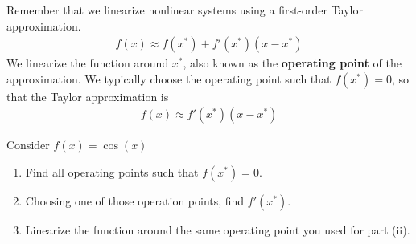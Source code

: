 

Remember that we linearize nonlinear systems using a first-order Taylor approximation.
\begin{align}
f(x) \approx f(x^{*}) + f'(x^{*})(x - x^{*})
\end{align}
We linearize the function around $x^{*}$, also known as the \textbf{operating point} of the approximation.
We typically choose the operating point such that $f(x^{*}) = 0$, so that the Taylor approximation is
\begin{align}
f(x) \approx f'(x^{*})(x - x^{*})
\end{align}

\begin{enumerate}
    \qitem Consider $f(x) = \cos(x)$
    \begin{enumerate}[label = (\roman*)]
        \item Find all operating points such that $f(x^{*}) = 0$. \\

        \item Choosing one of those operation points, find $f'(x^{*})$. \\

        \item Linearize the function around the same operating point you used for part (ii). \\
    \end{enumerate}


\end{enumerate}
